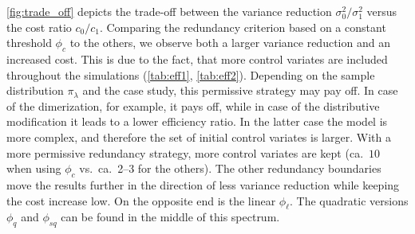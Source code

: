 \autoref{fig:trade_off} depicts the trade-off between the variance reduction $\sigma_0^2/\sigma_1^2$
versus the cost ratio $c_0/c_1$. Comparing the redundancy criterion based on a constant threshold
$\phi_c$ to the others,
we observe both a larger variance reduction and an increased cost. This is due to the fact, that
more control  variates are included throughout the simulations (\autoref{tab:eff1}, \autoref{tab:eff2}). Depending on the sample distribution $\pi_{\lambda}$
and the case study, this permissive strategy may pay off. In case of the dimerization, for example,
it pays off, while in case of the distributive modification it leads to a lower efficiency ratio.
In the latter case the model is more complex, and therefore the set of initial
control  variates is larger. With a more permissive redundancy strategy, more control  variates are kept
(ca.\ $10$ when using $\phi_c$ vs.\ ca.\ \numrange{2}{3} for the others).
The other redundancy boundaries move the results further in the direction of less variance reduction
while keeping the cost increase low.
On the opposite end is the linear $\phi_{\ell}$.
The quadratic versions $\phi_{q}$ and $\phi_{\mathit{sq}}$ can be found in the middle of this spectrum.
